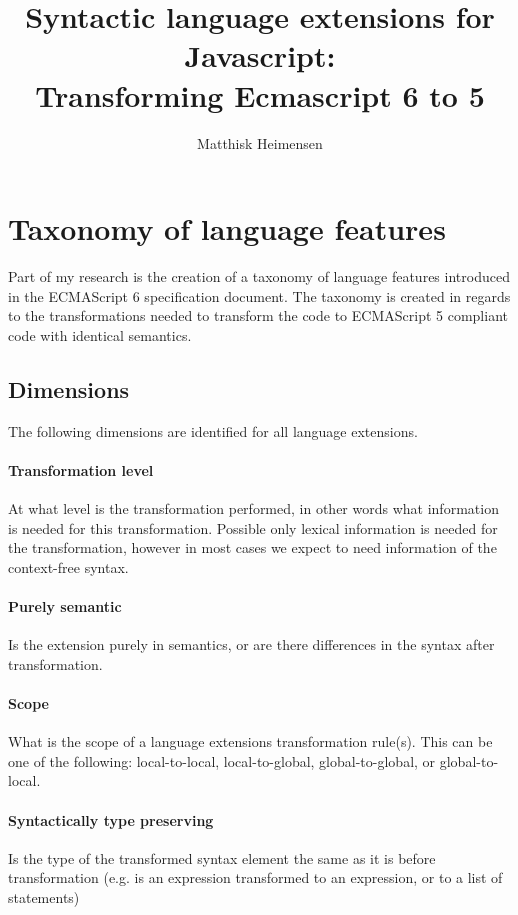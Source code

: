 \documentclass[10pt,a4paper,draft]{article}
\title{%
	Syntactic language extensions for Javascript: \\
	\large Transforming Ecmascript 6 to 5}
\author{Matthisk Heimensen}
\begin{document}
	\maketitle
	\tableofcontents
\section{Taxonomy of language features}
Part of my research is the creation of a taxonomy of language features introduced in the ECMAScript 6 specification document. The taxonomy is created in regards to the transformations needed to transform the code to ECMAScript 5 compliant code with identical semantics.

\subsection{Dimensions}
The following dimensions are identified for all language extensions.

\paragraph{Transformation level}
At what level is the transformation performed, in other words what information is needed for this transformation. Possible only lexical information is needed for the transformation, however in most cases we expect to need information of the context-free syntax.

\paragraph{Purely semantic}
Is the extension purely in semantics, or are there differences in the syntax after transformation.

\paragraph{Scope}
What is the scope of a language extensions transformation rule(s). This can be one of the following: local-to-local, local-to-global, global-to-global, or global-to-local.

\paragraph{Syntactically type preserving}
Is the type of the transformed syntax element the same as it is before transformation (e.g. is an expression transformed to an expression, or to a list of statements)
\end{document}
